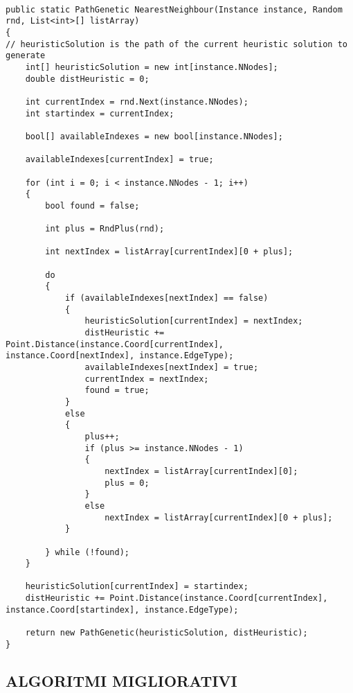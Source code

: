 \documentclass[11pt]{article}
\begin{document}
\begin{lstlisting}

public static PathGenetic NearestNeighbour(Instance instance, Random rnd, List<int>[] listArray)
{
// heuristicSolution is the path of the current heuristic solution to generate
    int[] heuristicSolution = new int[instance.NNodes];
    double distHeuristic = 0;

    int currentIndex = rnd.Next(instance.NNodes);
    int startindex = currentIndex;

    bool[] availableIndexes = new bool[instance.NNodes];

    availableIndexes[currentIndex] = true;

    for (int i = 0; i < instance.NNodes - 1; i++)
    {
        bool found = false;

        int plus = RndPlus(rnd);

        int nextIndex = listArray[currentIndex][0 + plus];

        do
        {
            if (availableIndexes[nextIndex] == false)
            {
                heuristicSolution[currentIndex] = nextIndex;
                distHeuristic += Point.Distance(instance.Coord[currentIndex], instance.Coord[nextIndex], instance.EdgeType);
                availableIndexes[nextIndex] = true;
                currentIndex = nextIndex;
                found = true;
            }
            else
            {
                plus++;
                if (plus >= instance.NNodes - 1)
                {
                    nextIndex = listArray[currentIndex][0];
                    plus = 0;
                }
                else
                    nextIndex = listArray[currentIndex][0 + plus];
            }

        } while (!found);
    }

    heuristicSolution[currentIndex] = startindex;
    distHeuristic += Point.Distance(instance.Coord[currentIndex], instance.Coord[startindex], instance.EdgeType);

    return new PathGenetic(heuristicSolution, distHeuristic);
}

\end{lstlisting}

\subsection*{ALGORITMI MIGLIORATIVI}
\end{document}
